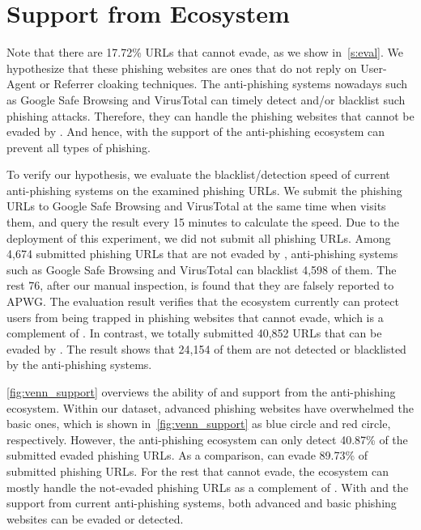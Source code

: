 \section{Support from Ecosystem}

Note that there are 17.72\% URLs that \spartacus cannot evade,
as we show in~\autoref{s:eval}.
We hypothesize that these phishing websites are ones that do not reply on User-Agent or Referrer cloaking techniques.
The anti-phishing systems nowadays such as Google Safe Browsing and VirusTotal can timely detect and/or blacklist such phishing attacks.
Therefore, they can handle the phishing websites that cannot be evaded by \spartacus.
And hence, \spartacus with the support of the anti-phishing ecosystem can prevent all types of phishing.

To verify our hypothesis, we evaluate the blacklist/detection speed of current anti-phishing systems on the examined phishing URLs.
We submit the phishing URLs to Google Safe Browsing and VirusTotal at the same time when \spartacus visits them, and query the result every 15 minutes to calculate the speed.
Due to the deployment of this experiment, we did not submit all phishing URLs.
Among 4,674 submitted phishing URLs that are not evaded by \spartacus, anti-phishing systems such as Google Safe Browsing and VirusTotal can blacklist 4,598 of them.
The rest 76, after our manual inspection, is found that they are falsely reported to APWG.
The evaluation result verifies that the ecosystem currently can protect users from being trapped in phishing websites that \spartacus cannot evade, which is a complement of \spartacus.
In contrast, we totally submitted 40,852 URLs that can be evaded by \spartacus.
The result shows that 24,154 of them are not detected or blacklisted by the anti-phishing systems.



\autoref{fig:venn_support} overviews the ability of \spartacus and support from the anti-phishing ecosystem.
Within our dataset, advanced phishing websites have overwhelmed the basic ones, which is shown in~\autoref{fig:venn_support} as blue circle and red circle, respectively.
However, the anti-phishing ecosystem can only detect 40.87\% of the submitted evaded phishing URLs.
As a comparison, \spartacus can evade 89.73\% of submitted phishing URLs.
For the rest that \spartacus cannot evade,
the ecosystem can mostly handle the not-evaded phishing URLs as a complement of \spartacus.
With \spartacus and the support from current anti-phishing systems, 
both advanced and basic phishing websites can be evaded or detected.

